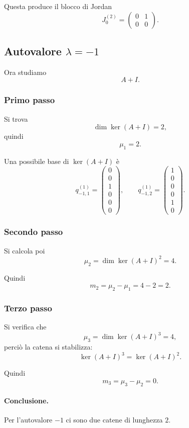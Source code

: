 Questa produce il blocco di Jordan
\[
J_0^{(2)}=
\begin{pmatrix}
0 & 1\\
0 & 0
\end{pmatrix}.
\]

\subsection{Autovalore \texorpdfstring{$\lambda=-1$}{lambda=-1}}

Ora studiamo
\[
A+I.
\]

\subsubsection*{Primo passo}

Si trova
\[
\dim\ker(A+I)=2,
\]
quindi
\[
\mu_1=2.
\]

Una possibile base di $\ker(A+I)$ è
\[
q_{-1,1}^{(1)}=
\begin{pmatrix}
0\\
0\\
1\\
0\\
0\\
0
\end{pmatrix},
\qquad
q_{-1,2}^{(1)}=
\begin{pmatrix}
1\\
0\\
0\\
0\\
1\\
0
\end{pmatrix}.
\]

\subsubsection*{Secondo passo}

Si calcola poi
\[
\mu_2=\dim\ker(A+I)^2=4.
\]

Quindi
\[
m_2=\mu_2-\mu_1=4-2=2.
\]

\subsubsection*{Terzo passo}

Si verifica che
\[
\mu_3=\dim\ker(A+I)^3=4,
\]
perciò la catena si stabilizza:
\[
\ker(A+I)^3=\ker(A+I)^2.
\]

Quindi
\[
m_3=\mu_3-\mu_2=0.
\]

\paragraph{Conclusione.}
Per l'autovalore $-1$ ci sono due catene di lunghezza $2$.

